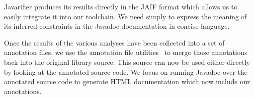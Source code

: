 Javarifier produces its results directly in the JAIF format which allows us to
easily integrate it into our toolchain. We need simply to express the meaning
of its inferred constraints in the Javadoc documentation in concise language.

Once the results of the various analyses have been collected into a set of
annotation files, we use the annotation file utilities~\cite{AFU} to merge
those annotations back into the original library source. This source
can now be used either directly by looking at the annotated source code. We
focus on running Javadoc over the annotated source code to generate HTML documentation
which now include our annotations.

